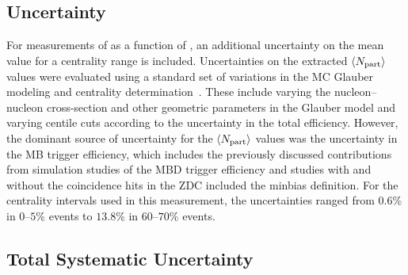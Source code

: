 \subsection{\Npart Uncertainty}
For measurements of \detdeta as a function of \Npart, an additional uncertainty on the mean \Npart value for a centrality range is included. 
Uncertainties on the extracted $\left<\mbox{$N_{\mathrm{part}}$}\right>$ values were evaluated using a standard set of variations in the MC Glauber modeling and centrality determination~\cite{Lis1}. 
These include varying the nucleon--nucleon cross-section and other geometric parameters in the Glauber model and varying centile cuts according to the uncertainty in the total efficiency. 
However, the dominant source of uncertainty for the  $\left<\mbox{$N_{\mathrm{part}}$}\right>$ values was the uncertainty in the MB trigger efficiency, which includes the previously discussed contributions from simulation studies of the MBD trigger efficiency and studies with and without the coincidence hits in the ZDC included the minbias definition. 
For the centrality intervals used in this measurement, the uncertainties ranged from $0.6$\% in $0$--$5$\% events to $13.8$\% in $60$--$70$\% events. 

\subsection{Total Systematic Uncertainty}

